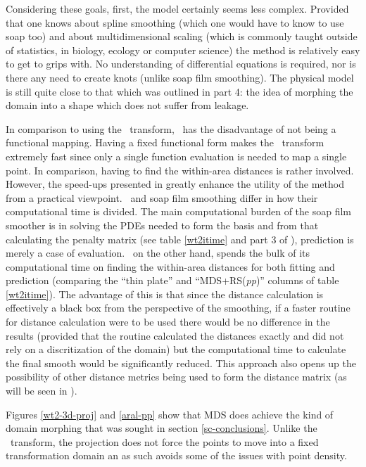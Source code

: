 Considering these goals, first, the model certainly seems less complex. Provided that one knows about spline smoothing (which one would have to know to use soap too) and about multidimensional scaling (which is commonly taught outside of statistics, in biology, ecology or computer science) the method is relatively easy to get to grips with. No understanding of differential equations is required, nor is there any need to create knots (unlike soap film smoothing). The physical model is still quite close to that which was outlined in  part 4: the idea of morphing the domain into a shape which does not suffer from leakage.

In comparison to using the \sch\ transform, \mdsap\ has the disadvantage of not being a functional mapping. Having a fixed functional form makes the \sch\ transform extremely fast since only a single function evaluation is needed to map a single point. In comparison, having to find the within-area distances is rather involved. However, the speed-ups presented in  greatly enhance the utility of the method from a practical viewpoint. \mdsap\ and soap film smoothing differ in how their computational time is divided. The main computational burden of the soap film smoother is in solving the PDEs needed to form the basis and from that calculating the penalty matrix (see table \ref{wt2itime} and part 3 of ), prediction is merely a case of evaluation. \mdsap\ on the other hand, spends the bulk of its computational time on finding the within-area distances for both fitting and prediction (comparing the ``thin plate'' and ``MDS+RS(\textit{pp})'' columns of table \ref{wt2itime}). The advantage of this is that since the distance calculation is effectively a black box from the perspective of the smoothing, if a faster routine for distance calculation were to be used there would be no difference in the results (provided that the routine calculated the distances exactly and did not rely on a discritization of the domain) but the computational time to calculate the final smooth would be significantly reduced. This approach also opens up the possibility of other distance metrics being used to form the distance matrix (as will be seen in ).

Figures \ref{wt2-3d-proj} and \ref{aral-pp} show that MDS does achieve the kind of domain morphing that was sought in section \ref{sc-conclusions}. Unlike the \sch\ transform, the projection does not force the points to move into a fixed transformation domain an as such avoids some of the issues with point density. 

